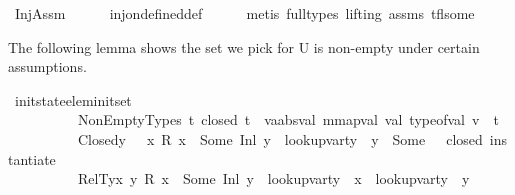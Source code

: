 \begin{isabellebody}
\ InjAssm\isanewline
\ \ \ \ \isamarkupfalse%
\ inj{\isacharunderscore}{\kern0pt}on{\isacharunderscore}{\kern0pt}defined{\isacharunderscore}{\kern0pt}def\isanewline
\ \ \ \ \isamarkupfalse%
\ {\isacharparenleft}{\kern0pt}metis\ {\isacharparenleft}{\kern0pt}full{\isacharunderscore}{\kern0pt}types{\isacharcomma}{\kern0pt}\ lifting{\isacharparenright}{\kern0pt}\ assms{\isacharparenleft}{\kern0pt}{}{\isacharparenright}{\kern0pt}\ tfl{\isacharunderscore}{\kern0pt}some{\isacharparenright}{\kern0pt}\ \ \ \ \isanewline
{}\isamarkupfalse%
%
\endisatagproof
{\isafoldproof}%
%
\isadelimproof
%
\endisadelimproof
%
\begin{isamarkuptext}%
The following lemma shows the set we pick for U is non-empty under certain assumptions.%
\end{isamarkuptext}\isamarkuptrue%
\isamarkupfalse%
\ init{\isacharunderscore}{\kern0pt}state{\isacharunderscore}{\kern0pt}elem{\isacharunderscore}{\kern0pt}init{\isacharunderscore}{\kern0pt}set{\isacharcolon}{\kern0pt}\isanewline
\ \ \ \isanewline
\ \ \ \ \ \ \ \ \ \ NonEmptyTypes{\isacharcolon}{\kern0pt}{\isachardoublequoteopen}{\isasymAnd}\ t{\isachardot}{\kern0pt}\ closed\ t\ {\isasymLongrightarrow}\ {\isasymexists}v{\isacharcolon}{\kern0pt}{\isacharcolon}{\kern0pt}{\isacharparenleft}{\kern0pt}{\isacharprime}{\kern0pt}a{\isacharcolon}{\kern0pt}{\isacharcolon}{\kern0pt}absval{\isacharcomma}{\kern0pt}\ {\isacharprime}{\kern0pt}m{\isacharcolon}{\kern0pt}{\isacharcolon}{\kern0pt}mapval{\isacharparenright}{\kern0pt}\ val{\isachardot}{\kern0pt}\ type{\isacharunderscore}{\kern0pt}of{\isacharunderscore}{\kern0pt}val\ v\ {\isacharequal}{\kern0pt}\ t{\isachardoublequoteclose}\ \isanewline
\ \ \ \ \ \ \ \ \ \ Closed{\isacharcolon}{\kern0pt}{\isachardoublequoteopen}{\isasymAnd}y\ {\isasymtau}{\isachardot}{\kern0pt}\ {\isasymnot}{\isacharparenleft}{\kern0pt}{\isasymexists}\ x{\isachardot}{\kern0pt}\ R\ x\ {\isacharequal}{\kern0pt}\ Some\ {\isacharparenleft}{\kern0pt}Inl\ y{\isacharparenright}{\kern0pt}{\isacharparenright}{\kern0pt}\ {\isasymLongrightarrow}\ lookup{\isacharunderscore}{\kern0pt}var{\isacharunderscore}{\kern0pt}ty\ {\isasymLambda}{\isacharprime}{\kern0pt}\ y\ {\isacharequal}{\kern0pt}\ Some\ {\isasymtau}\ {\isasymLongrightarrow}\ closed\ {\isacharparenleft}{\kern0pt}instantiate\ {\isasymOmega}\ {\isasymtau}{\isacharparenright}{\kern0pt}{\isachardoublequoteclose}\ \ \ \ \ \ \ \ \ \ \ \isanewline
\ \ \ \ \ \ \ \ \ \ RelTy{\isacharcolon}{\kern0pt}{\isachardoublequoteopen}{\isasymAnd}x\ y{\isachardot}{\kern0pt}\ R\ x\ {\isacharequal}{\kern0pt}\ Some\ {\isacharparenleft}{\kern0pt}Inl\ y{\isacharparenright}{\kern0pt}\ {\isasymLongrightarrow}\ lookup{\isacharunderscore}{\kern0pt}var{\isacharunderscore}{\kern0pt}ty\ {\isasymLambda}\ x\ {\isacharequal}{\kern0pt}\ lookup{\isacharunderscore}{\kern0pt}var{\isacharunderscore}{\kern0pt}ty\ {\isasymLambda}{\isacharprime}{\kern0pt}\ y{\isachardoublequoteclose}\ \isanewline

\end{isabellebody}
